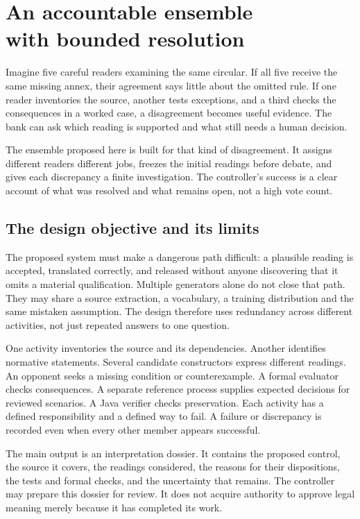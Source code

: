 \chapter[An accountable ensemble with bounded resolution]{An accountable ensemble\\with bounded resolution}
\label{ch:ensemble}

Imagine five careful readers examining the same circular. If all five receive
the same missing annex, their agreement says little about the omitted rule. If
one reader inventories the source, another tests exceptions, and a third checks
the consequences in a worked case, a disagreement becomes useful evidence. The
bank can ask which reading is supported and what still needs a human decision.

The ensemble proposed here is built for that kind of disagreement. It assigns
different readers different jobs, freezes the initial readings before debate,
and gives each discrepancy a finite investigation. The controller's success is
a clear account of what was resolved and what remains open, not a high vote
count.


\section{The design objective and its limits}
\label{merge:M06:00}


The proposed system must make a dangerous path difficult: a plausible reading is
accepted, translated correctly, and released without anyone discovering that it
omits a material qualification. Multiple generators alone do not close that path.
They may share a source extraction, a vocabulary, a training distribution and the
same mistaken assumption. The design therefore uses redundancy across different
activities, not just repeated answers to one question.

One activity inventories the source and its dependencies. Another identifies
normative statements. Several candidate constructors express different readings.
An opponent seeks a missing condition or counterexample. A formal evaluator
checks consequences. A separate reference process supplies expected decisions
for reviewed scenarios. A Java verifier checks preservation. Each activity has a
defined responsibility and a defined way to fail. A failure or discrepancy is
recorded even when every other member appears successful.

The main output is an interpretation dossier. It contains the proposed control,
the source it covers, the readings considered, the reasons for their dispositions,
the tests and formal checks, and the uncertainty that remains. The controller
may prepare this dossier for review. It does not acquire authority to approve
legal meaning merely because it has completed its work.

